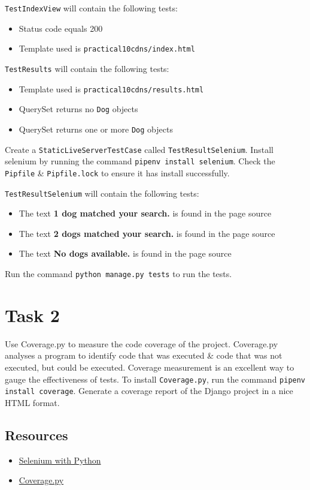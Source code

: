 \documentclass{article}
\begin{document}
\texttt{TestIndexView} will contain the following tests:
\begin{itemize}
  \item Status code equals 200
  \item Template used is \texttt{practical10cdns/index.html}
\end{itemize}

\texttt{TestResults} will contain the following tests:
\begin{itemize}
  \item Template used is \texttt{practical10cdns/results.html}
  \item QuerySet returns no \texttt{Dog} objects
  \item QuerySet returns one or more \texttt{Dog} objects
\end{itemize}

Create a \texttt{StaticLiveServerTestCase} called \texttt{TestResultSelenium}. Install selenium by running the command \texttt{pipenv install selenium}. Check the \texttt{Pipfile} \& \texttt{Pipfile.lock} to ensure it has install successfully. 

\texttt{TestResultSelenium} will contain the following tests:
\begin{itemize}
  \item The text \textbf{1 dog matched your search.} is found in the page source
  \item The text \textbf{2 dogs matched your search.}  is found in the page source
  \item The text \textbf{No dogs available.} is found in the page source
\end{itemize}

Run the command \texttt{python manage.py tests} to run the tests.

\section*{Task 2} 
Use Coverage.py to measure the code coverage of the project. Coverage.py analyses a program to identify code that was executed \& code that was not executed, but could be executed. Coverage measurement is an excellent way to gauge the effectiveness of tests. To install \texttt{Coverage.py}, run the command \texttt{pipenv install coverage}. Generate a coverage report of the Django project in a nice HTML format. 

\subsection*{Resources} 
\begin{itemize}
  \item \href{https://selenium-python.readthedocs.io/}{Selenium with Python}
  \item \href{https://coverage.readthedocs.io/en/coverage-5.2.1/}{Coverage.py}
\end{itemize}
\end{document}

